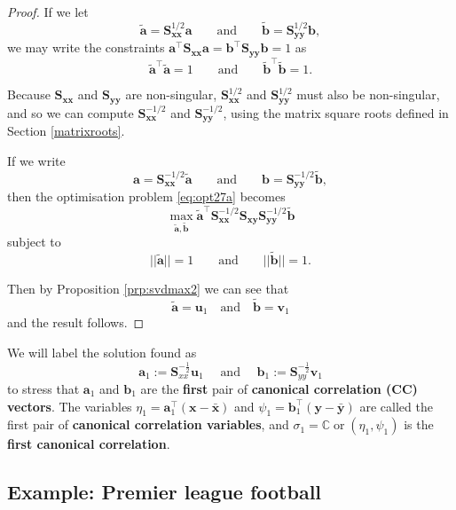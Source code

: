 \documentclass[
]{book}
\theoremstyle{definition}
\theoremstyle{definition}
\theoremstyle{definition}
\theoremstyle{definition}
\theoremstyle{remark}
\begin{document}
\begin{proof}
If we let
\[
\tilde{\mathbf a}=\mathbf S_{\mathbf x\mathbf x}^{1/2} \mathbf a\qquad \text{and} \qquad \tilde{\mathbf b}=\mathbf S_{\mathbf y\mathbf y}^{1/2}\mathbf b,
\]
we may write the constraints \(\mathbf a^\top \mathbf S_{\mathbf x\mathbf x}\mathbf a=\mathbf b^\top \mathbf S_{\mathbf y\mathbf y}\mathbf b=1\) as
\[
\tilde{\mathbf a}^\top \tilde{\mathbf a}=1 \qquad \text{and} \qquad \tilde{\mathbf b}^\top \tilde{\mathbf b}=1.
\]

Because \(\mathbf S_{\mathbf x\mathbf x}\) and \(\mathbf S_{\mathbf y\mathbf y}\) are non-singular, \(\mathbf S_{\mathbf x\mathbf x}^{1/2}\) and \(\mathbf S_{\mathbf y\mathbf y}^{1/2}\) must also be non-singular, and so we can compute
\(\mathbf S_{\mathbf x\mathbf x}^{-1/2}\) and \(\mathbf S_{\mathbf y\mathbf y}^{-1/2}\), using the matrix square roots defined in Section \ref{matrixroots}.

If we write
\[
\mathbf a=\mathbf S_{\mathbf x\mathbf x}^{-1/2}\tilde{\mathbf a} \qquad \text{and} \qquad \mathbf b=\mathbf S_{\mathbf y\mathbf y}^{-1/2} \tilde{\mathbf b},
\]
then the optimisation problem \eqref{eq:opt27a} becomes
\[
\max_{\tilde{\mathbf a}, \tilde{\mathbf b}}
\tilde{\mathbf a}^\top \mathbf S_{\mathbf x\mathbf x}^{-1/2}\mathbf S_{\mathbf x\mathbf y}\mathbf S_{\mathbf y\mathbf y}^{-1/2} \tilde{\mathbf b}
\]
subject to
\[
\vert \vert \tilde{\mathbf a} \vert \vert =1 \qquad \text{and} \qquad \vert \vert \tilde{\mathbf b}\vert \vert=1.
\]

Then by Proposition \ref{prp:svdmax2} we can see that
\[\tilde{\mathbf a} = \mathbf u_1 \quad \mbox{and}\quad\tilde{\mathbf b} = \mathbf v_1\]
and the result follows.
\end{proof}

We will label the solution found as
\[\mathbf a_1 := \mathbf S_{xx}^{-\frac{1}{2}}\mathbf u_1\quad \mbox{ and }\quad\mathbf b_1 := \mathbf S_{yy}^{-\frac{1}{2}}\mathbf v_1\]
to stress that \(\mathbf a_1\) and \(\mathbf b_1\) are the \textbf{first} pair of \textbf{canonical correlation (CC) vectors}. The variables \(\eta_1=\mathbf a_1^\top (\mathbf x-\bar{\mathbf x})\) and \(\psi_1=\mathbf b_1^\top (\mathbf y-\bar{\mathbf y})\) are called the first pair of \textbf{canonical correlation variables}, and \(\sigma_1={\mathbb{C}\operatorname{or}}(\eta_1, \psi_1)\) is the \textbf{first canonical correlation}.

\hypertarget{premcca}{%
\subsection{Example: Premier league football}\label{premcca}}
\end{document}
